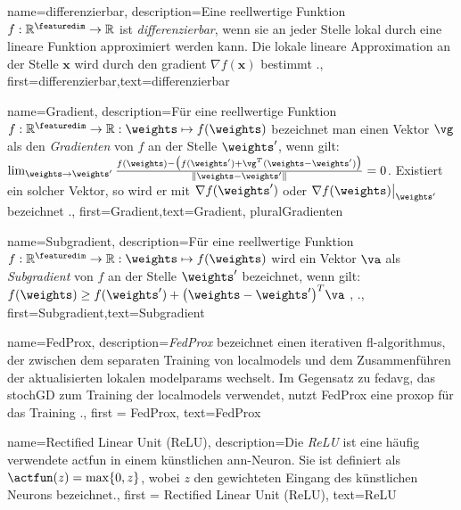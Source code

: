 {{{{	
	{name={differenzierbar},
		description={Eine reellwertige Funktion $f: \mathbb{R}^{\featuredim} \rightarrow \mathbb{R}$ 
			ist \textit{differenzierbar}, wenn sie an jeder Stelle lokal durch eine lineare Funktion 
			approximiert werden kann. Die lokale lineare Approximation an der Stelle $\mathbf{x}$ 
			wird durch den \gls{gradient} $\nabla f ( \mathbf{x})$ bestimmt 
			\cite{RudinBookPrinciplesMatheAnalysis}.},
		first={differenzierbar},text={differenzierbar} 
	}
	
	{name={Gradient},
		description={Für eine reellwertige Funktion $f: \mathbb{R}^{\featuredim} \rightarrow \mathbb{R}: \weights \mapsto f(\weights)$ 
			bezeichnet man einen Vektor $\vg$ als den \emph{Gradienten} von $f$ an der Stelle $\weights'$, 
			wenn gilt: $\lim_{\weights \rightarrow \weights'} \frac{f(\weights) - \big(f(\weights')+ \vg^{T} (\weights- \weights') \big) }{\| \weights-\weights'\|}=0$. 
			Existiert ein solcher Vektor, so wird er mit $\nabla f(\weights')$ oder $\nabla f(\weights)\big|_{\weights'}$ bezeichnet 
			\cite{RudinBookPrinciplesMatheAnalysis}.},
		first={Gradient},text={Gradient}, plural{Gradienten} 
	}

{name={Subgradient},
	description={Für eine reellwertige Funktion $f: \mathbb{R}^{\featuredim} \rightarrow \mathbb{R}: \weights \mapsto f(\weights)$ 
		wird ein Vektor $\va$ als \emph{Subgradient} von $f$ an der Stelle $\weights'$ bezeichnet, 
		wenn gilt: $f(\weights) \geq f(\weights') + \big(\weights - \weights' \big)^{T} \va$ 
		\cite{BertCvxAnalOpt}, \cite{BertsekasNonLinProgr}.},
	first={Subgradient},text={Subgradient} 
}

{name={FedProx},
	description={\textit{FedProx} bezeichnet einen iterativen \gls{fl}-\gls{algorithmus}, 
		der zwischen dem separaten Training von \gls{localmodel}s und dem Zusammenführen der aktualisierten lokalen \glspl{modelparam} wechselt. 
		Im Gegensatz zu \gls{fedavg}, das \gls{stochGD} zum Training der \gls{localmodel}s verwendet, 
		nutzt FedProx eine \gls{proxop} für das Training \cite{FedProx2020}.},
	first = {FedProx}, text={FedProx} 
}

{name={Rectified Linear Unit (ReLU)},
	description={Die \textit{ReLU} ist eine häufig verwendete \gls{actfun} 
		in einem künstlichen \gls{ann}-Neuron. Sie ist definiert als 
		$\actfun(z) = \max\{0,z\}$, wobei $z$ den gewichteten Eingang des künstlichen Neurons bezeichnet.},
	first = {Rectified Linear Unit (ReLU)}, text={ReLU} 
}

}}}}
